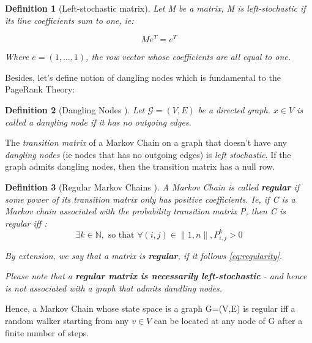 \documentclass{article}
\newtheorem{definition}{Definition}[section]
\begin{document}
\begin{definition}[Left-stochastic matrix]

Let M be a matrix, M is left-stochastic if its line coefficients sum to one, ie:

\begin{equation}
    M e^T = e^T
\end{equation}

Where $e = (1, \hdots, 1)$, the row vector whose coefficients are all equal to one.

\end{definition}

Besides, let's define notion of dangling nodes which is fundamental to the PageRank Theory:

\begin{definition}[Dangling Nodes \cite{langville_meyer_2004}]\label{def:dangling}
Let $\mathcal{G}=(V,E)$ be a directed graph. $x \in V$ is called a dangling node if it has no outgoing edges.
\end{definition}

The \textit{transition matrix} of a Markov Chain on a graph that doesn't have any \textit{dangling nodes} (ie nodes that has no outgoing edges) is \textit{left stochastic}. If the graph admits dangling nodes, then the transition matrix has a null row.

\begin{definition}[Regular Markov Chains \cite{grinstead_snell_2006}]
\label{def:Regular_Markov}
A Markov Chain is called \textbf{regular} if some power of its transition matrix only has positive coefficients. Ie, if C is a Markov chain associated with the probability transition matrix P, then C is regular iff : \begin{equation}\label{eq:regularity}
    \exists k \in \mathbb{N}, \mbox{ so that } \forall (i,j) \in \|1, n\|, P^k_{i,j}>0 
\end{equation}

By extension, we say that a matrix is \textbf{regular}, if it follows \ref{eq:regularity}.

Please note that a \textbf{regular matrix is necessarily left-stochastic} - and hence is not associated with a graph that admits dandling nodes.

\end{definition}

Hence, a Markov Chain whose state space is a graph G=(V,E) is regular iff a random walker starting from any $v \in V$ can be located at any node of G after a finite number of steps.
\end{document}
